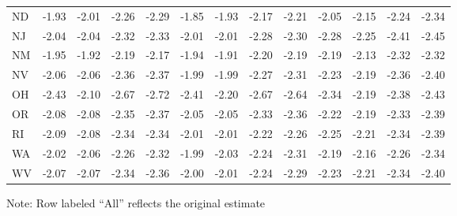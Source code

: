 \begin{landscape}
\begin{table}[H]
\begin{tabular}{lrrrr|rrrr|rrrr}
ND & -1.93 & -2.01 & -2.26 & -2.29 & -1.85 & -1.93 & -2.17 & -2.21 & -2.05 & -2.15 & -2.24 & -2.34 \\ 
NJ & -2.04 & -2.04 & -2.32 & -2.33 & -2.01 & -2.01 & -2.28 & -2.30 & -2.28 & -2.25 & -2.41 & -2.45 \\ 
NM & -1.95 & -1.92 & -2.19 & -2.17 & -1.94 & -1.91 & -2.20 & -2.19 & -2.19 & -2.13 & -2.32 & -2.32 \\ 
NV & -2.06 & -2.06 & -2.36 & -2.37 & -1.99 & -1.99 & -2.27 & -2.31 & -2.23 & -2.19 & -2.36 & -2.40 \\ 
OH & -2.43 & -2.10 & -2.67 & -2.72 & -2.41 & -2.20 & -2.67 & -2.64 & -2.34 & -2.19 & -2.38 & -2.43 \\ 
OR & -2.08 & -2.08 & -2.35 & -2.37 & -2.05 & -2.05 & -2.33 & -2.36 & -2.22 & -2.19 & -2.33 & -2.39 \\ 
RI & -2.09 & -2.08 & -2.34 & -2.34 & -2.01 & -2.01 & -2.22 & -2.26 & -2.25 & -2.21 & -2.34 & -2.39 \\ 
WA & -2.02 & -2.06 & -2.26 & -2.32 & -1.99 & -2.03 & -2.24 & -2.31 & -2.19 & -2.16 & -2.26 & -2.34 \\ 
WV & -2.07 & -2.07 & -2.34 & -2.36 & -2.00 & -2.01 & -2.24 & -2.29 & -2.23 & -2.21 & -2.34 & -2.40 \\ 
 \hline
\end{tabular}
\begin{tablenotes}
  \item Note: Row labeled ``All'' reflects the original estimate
\end{tablenotes}
\end{table}


\end{landscape}
